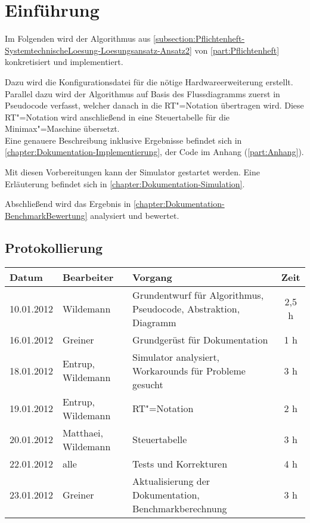 \chapter{Einführung}
\label{chapter:Dokumentation-Einfuehrung}

Im Folgenden wird der Algorithmus aus \autoref{subsection:Pflichtenheft-SystemtechnischeLoesung-Loesungsansatz-Ansatz2} von \autoref{part:Pflichtenheft} konkretisiert und implementiert.

Dazu wird die Konfigurationsdatei für die nötige Hardwareerweiterung erstellt. Parallel dazu wird der Algorithmus auf Basis des Flussdiagramms zuerst in Pseudocode verfasst, welcher danach in die RT"=Notation übertragen wird. Diese RT"=Notation wird anschließend in eine Steuertabelle für die Minimax"=Maschine übersetzt.\\
Eine genauere Beschreibung inklusive Ergebnisse befindet sich in \autoref{chapter:Dokumentation-Implementierung}, der Code im Anhang (\autoref{part:Anhang}).

Mit diesen Vorbereitungen kann der Simulator gestartet werden. Eine Erläuterung befindet sich in \autoref{chapter:Dokumentation-Simulation}.

Abschließend wird das Ergebnis in \autoref{chapter:Dokumentation-BenchmarkBewertung} analysiert und bewertet.


\section{Protokollierung}
\label{section:Dokumentation-Einfuehrung-Protokollierung}

\begin{tabularx}{\textwidth}{|l|l|X|c|}
    \hline
    Datum & Bearbeiter & Vorgang & Zeit \\
    \hline
    \hline
    10.01.2012 & Wildemann & Grundentwurf für Algorithmus, Pseudocode, Abstraktion, Diagramm & 2,5 h \\
    \hline
    16.01.2012 & Greiner & Grundgerüst für Dokumentation & 1 h \\
    \hline
    18.01.2012 & Entrup, Wildemann & Simulator analysiert, Workarounds für Probleme gesucht & 3 h \\
    \hline
    19.01.2012 & Entrup, Wildemann & RT"=Notation & 2 h\\
    \hline
    20.01.2012 & Matthaei, Wildemann & Steuertabelle & 3 h\\
    \hline
    22.01.2012 & alle & Tests und Korrekturen & 4 h\\
    \hline
    23.01.2012 & Greiner & Aktualisierung der Dokumentation, Benchmarkberechnung & 3 h \\
    \hline
\end{tabularx}
